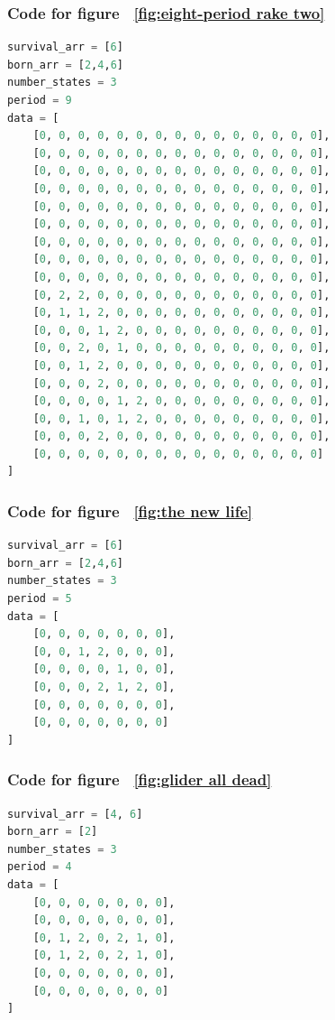 \documentclass[12pt]{article}
\numberwithin{figure}{section} %
\begin{document}
\subsubsection{Code for figure ~\ref{fig:eight-period rake two}}
\label{subsubsection:eight-period rake two}
\begin{lstlisting}[language = Python]
survival_arr = [6]
born_arr = [2,4,6]
number_states = 3
period = 9
data = [
    [0, 0, 0, 0, 0, 0, 0, 0, 0, 0, 0, 0, 0, 0, 0],
    [0, 0, 0, 0, 0, 0, 0, 0, 0, 0, 0, 0, 0, 0, 0],
    [0, 0, 0, 0, 0, 0, 0, 0, 0, 0, 0, 0, 0, 0, 0],
    [0, 0, 0, 0, 0, 0, 0, 0, 0, 0, 0, 0, 0, 0, 0],
    [0, 0, 0, 0, 0, 0, 0, 0, 0, 0, 0, 0, 0, 0, 0],
    [0, 0, 0, 0, 0, 0, 0, 0, 0, 0, 0, 0, 0, 0, 0],
    [0, 0, 0, 0, 0, 0, 0, 0, 0, 0, 0, 0, 0, 0, 0],
    [0, 0, 0, 0, 0, 0, 0, 0, 0, 0, 0, 0, 0, 0, 0],
    [0, 0, 0, 0, 0, 0, 0, 0, 0, 0, 0, 0, 0, 0, 0],
    [0, 2, 2, 0, 0, 0, 0, 0, 0, 0, 0, 0, 0, 0, 0],
    [0, 1, 1, 2, 0, 0, 0, 0, 0, 0, 0, 0, 0, 0, 0],
    [0, 0, 0, 1, 2, 0, 0, 0, 0, 0, 0, 0, 0, 0, 0],
    [0, 0, 2, 0, 1, 0, 0, 0, 0, 0, 0, 0, 0, 0, 0],
    [0, 0, 1, 2, 0, 0, 0, 0, 0, 0, 0, 0, 0, 0, 0],
    [0, 0, 0, 2, 0, 0, 0, 0, 0, 0, 0, 0, 0, 0, 0],
    [0, 0, 0, 0, 1, 2, 0, 0, 0, 0, 0, 0, 0, 0, 0],
    [0, 0, 1, 0, 1, 2, 0, 0, 0, 0, 0, 0, 0, 0, 0],
    [0, 0, 0, 2, 0, 0, 0, 0, 0, 0, 0, 0, 0, 0, 0],
    [0, 0, 0, 0, 0, 0, 0, 0, 0, 0, 0, 0, 0, 0, 0]
]
\end{lstlisting}

\noindent\begin{minipage}{.45\textwidth}
\subsubsection{Code for figure ~\ref{fig:the new life}}
\label{subsubsection:the new life}
\begin{lstlisting}[language = Python]
survival_arr = [6]
born_arr = [2,4,6]
number_states = 3
period = 5
data = [
    [0, 0, 0, 0, 0, 0, 0],
    [0, 0, 1, 2, 0, 0, 0],
    [0, 0, 0, 0, 1, 0, 0],
    [0, 0, 0, 2, 1, 2, 0],
    [0, 0, 0, 0, 0, 0, 0],
    [0, 0, 0, 0, 0, 0, 0]
]
\end{lstlisting}
\end{minipage}\hfill
\begin{minipage}{.5\textwidth}
\subsubsection{Code for figure ~\ref{fig:glider all dead}}
\label{subsubsection:glider all dead}
\begin{lstlisting}[language = Python]
survival_arr = [4, 6]
born_arr = [2]
number_states = 3
period = 4
data = [
    [0, 0, 0, 0, 0, 0, 0],
    [0, 0, 0, 0, 0, 0, 0],
    [0, 1, 2, 0, 2, 1, 0],
    [0, 1, 2, 0, 2, 1, 0],
    [0, 0, 0, 0, 0, 0, 0],
    [0, 0, 0, 0, 0, 0, 0]
]
\end{lstlisting}
\end{minipage}
\end{document}
